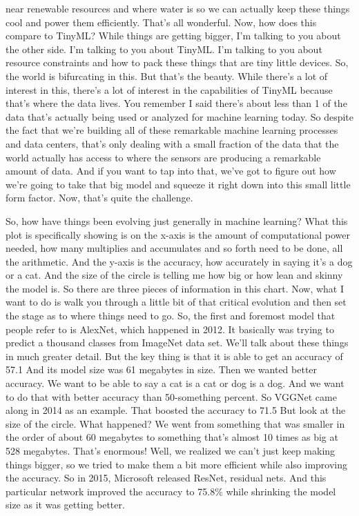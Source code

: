 near renewable resources and where water is
so we can actually keep these things cool and power them efficiently.
That's all wonderful.
Now, how does this compare to TinyML?
While things are getting bigger, I'm talking to you about the other side.
I'm talking to you about TinyML.
I'm talking to you about resource constraints
and how to pack these things that are tiny little devices.
So, the world is bifurcating in this.
But that's the beauty.
While there's a lot of interest in this, there's
a lot of interest in the capabilities of TinyML
because that's where the data lives.
You remember I said there's about less than 1%
of the data that's actually being used or analyzed for machine learning today.
So despite the fact that we're building all
of these remarkable machine learning processes and data centers,
that's only dealing with a small fraction of the data
that the world actually has access to where the sensors are
producing a remarkable amount of data.
And if you want to tap into that, we've got
to figure out how we're going to take that big model
and squeeze it right down into this small little form factor.
Now, that's quite the challenge.


So, how have things been evolving just generally in machine learning?
What this plot is specifically showing is
on the x-axis is the amount of computational power needed,
how many multiplies and accumulates and so forth need
to be done, all the arithmetic.
And the y-axis is the accuracy, how accurately in saying
it's a dog or a cat.
And the size of the circle is telling me how big
or how lean and skinny the model is.
So there are three pieces of information in this chart.
Now, what I want to do is walk you through a little bit
of that critical evolution and then set the stage
as to where things need to go.
So, the first and foremost model that people refer to
is AlexNet, which happened in 2012.
It basically was trying to predict a thousand
classes from ImageNet data set.
We'll talk about these things in much greater detail.
But the key thing is that it is able to get an accuracy of 57.1%
And its model size was 61 megabytes in size.
Then we wanted better accuracy.
We want to be able to say a cat is a cat or dog is a dog.
And we want to do that with better accuracy than 50-something percent.
So VGGNet came along in 2014 as an example.
That boosted the accuracy to 71.5%
But look at the size of the circle.
What happened?
We went from something that was smaller in the order of about 60 megabytes
to something that's almost 10 times as big at 528 megabytes.
That's enormous!
Well, we realized we can't just keep making things bigger,
so we tried to make them a bit more efficient
while also improving the accuracy.
So in 2015, Microsoft released ResNet, residual nets.
And this particular network improved the accuracy to 75.8\%
while shrinking the model size as it was getting better.

